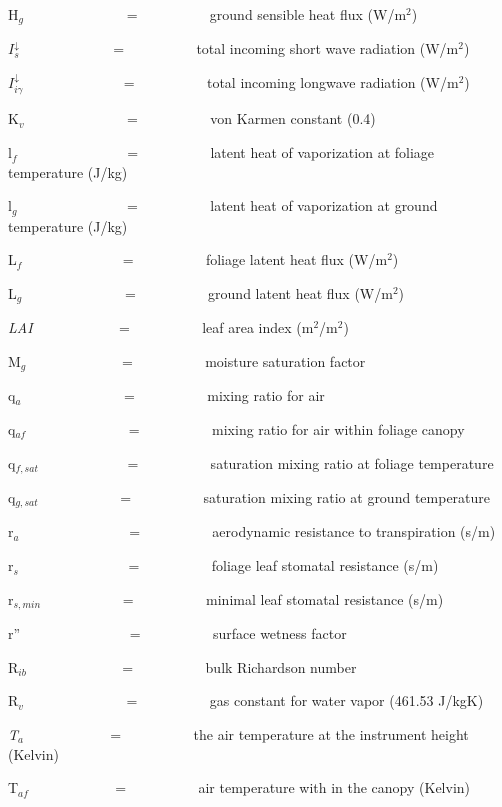 H\(_{g}\)~~~~~~~~~~~~~~ = ~~~~~~~~~ ground sensible heat flux (W/m\(^{2}\))

\(I_s^ \downarrow\) ~~~~~~~~~~~~ = ~~~~~~~~~ total incoming short wave radiation (W/m\(^{2}\))

\(I_{i\gamma }^ \downarrow\) ~~~~~~~~~~~~~ = ~~~~~~~~~ total incoming longwave radiation (W/m\(^{2}\))

K\(_{v}\)~~~~~~~~~~~~~~ = ~~~~~~~~~ von Karmen constant (0.4)

l\(_{f}\)~~~~~~~~~~~~~~~ = ~~~~~~~~~ latent heat of vaporization at foliage temperature (J/kg)

l\(_{g}\)~~~~~~~~~~~~~~~ = ~~~~~~~~~ latent heat of vaporization at ground temperature (J/kg)

L\emph{\(_{f}\)}~ ~~~~~~~~~~~~ = ~~~~~~~~~ foliage latent heat flux (W/m\(^{2}\))

L\(_{g}\)~~~~~~~~~~~~~~ = ~~~~~~~~~ ground latent heat flux (W/m\(^{2}\))

\emph{LAI}~ ~~~~~~~~~~ = ~~~~~~~~~ leaf area index (m\(^{2}\)/m\(^{2}\))

M\(_{g}\)~~~~~~~~~~~~~ = ~~~~~~~~~ moisture saturation factor

q\(_{a}\)~~~~~~~~~~~~~~ = ~~~~~~~~~ mixing ratio for air

q\(_{af}\)~~~~~~~~~~~~~~ = ~~~~~~~~~ mixing ratio for air within foliage canopy

q\(_{f,sat}\)~~~~~~~~~~~~ = ~~~~~~~~~ saturation mixing ratio at foliage temperature

q\(_{g,sat}\)~~~~~~~~~~~ = ~~~~~~~~~ saturation mixing ratio at ground temperature

r\(_{a}\)~~~~~~~~~~~~~~~ = ~~~~~~~~~ aerodynamic resistance to transpiration (s/m)

r\(_{s}\)~~~~~~~~~~~~~~~ = ~~~~~~~~~ foliage leaf stomatal resistance (s/m)

r\(_{s,min}\)~~~~~~~~~~~ = ~~~~~~~~~ minimal leaf stomatal resistance (s/m)

r''~~~~~~~~~~~~~~~ = ~~~~~~~~~ surface wetness factor

R\(_{ib}\)~~~~~~~~~~~~~ = ~~~~~~~~~ bulk Richardson number

R\(_{v}\)~~~~~~~~~~~~~~ = ~~~~~~~~~ gas constant for water vapor (461.53 J/kgK)

\emph{T\(_{a}\)} ~~~~~~~~~~~ = ~~~~~~~~~ the air temperature at the instrument height (Kelvin)

T\(_{af}\) ~~~~~~~~~~~ = ~~~~~~~~~ air temperature with in the canopy (Kelvin)

